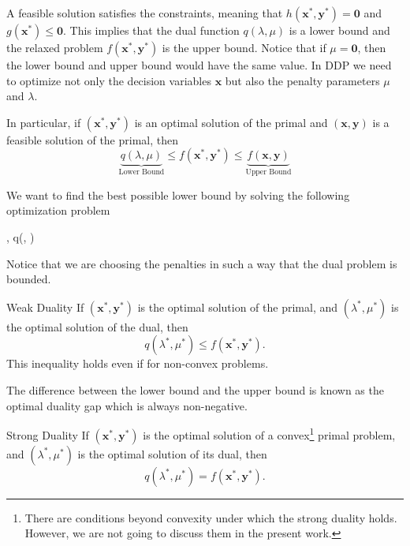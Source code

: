 A feasible solution satisfies the constraints, meaning that $h(\mathbf{x}^{*}, \mathbf{y}^{*})=\mathbf{0}$ and $g(\mathbf{x}^{*}) \leq \mathbf{0}$. This implies that the dual function $q(\lambda,\mu)$ is a lower bound and the relaxed problem $f(\mathbf{x}^{*}, \mathbf{y}^{*})$ is the upper bound. Notice that if $\mu = \mathbf{0}$, then the lower bound and upper bound would have the same value. In DDP we need to optimize not only the decision variables $\mathbf{x}$ but also the penalty parameters $\mu$ and $\lambda$.
\begin{corollary}{}{}
  In particular, if $(\mathbf{x}^{*}, \mathbf{y}^{*})$ is an optimal solution of the primal and $(\mathbf{x}, \mathbf{y})$ is a feasible solution of the primal, then
  \begin{equation}
      \underbrace{q({\lambda,\mu})}_{\text{Lower Bound}} \leq f(\mathbf{x}^{*}, \mathbf{y}^{*}) \leq \underbrace{f(\mathbf{x}, \mathbf{y})}_{\text{Upper Bound}}
  \end{equation}
\end{corollary}
We want to find the best possible lower bound by solving the following optimization problem
\begin{maxi!}[2]
	{\lambda, \mu}{q(\lambda, \mu)}{\label{eq: Abstract_Dual}}{}{}
\end{maxi!}
Notice that we are choosing the penalties in such a way that the dual problem is bounded.
\begin{theorem}{Weak Duality}{}
If $(\mathbf{x}^{*}, \mathbf{y}^{*})$ is the optimal solution of the primal, and $(\lambda^{*}, \mu^{*})$ is the optimal solution of the dual, then
\begin{equation}
    q(\lambda^{*}, \mu^{*}) \leq f(\mathbf{x}^{*}, \mathbf{y}^{*}).
\end{equation}
This inequality holds even if for non-convex problems.
\end{theorem}
The difference between the lower bound and the upper bound is known as the optimal duality gap which is always non-negative.
\begin{theorem}{Strong Duality}{}
If $(\mathbf{x}^{*}, \mathbf{y}^{*})$ is the optimal solution of a convex\footnote{There are conditions beyond convexity under which the strong duality holds. However, we are not going to discuss them in the present work.} primal problem, and $(\lambda^{*}, \mu^{*})$ is the optimal solution of its dual, then
\begin{equation}
    q(\lambda^{*}, \mu^{*}) = f(\mathbf{x}^{*}, \mathbf{y}^{*}).
\end{equation}
\end{theorem}

